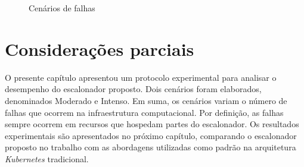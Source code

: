 \begin{figure}%
	\centering
	\qquad
	\caption{Cenários de falhas}%
	\label{fig:profiles-erro}%
\end{figure}

\section{Considerações parciais}

O presente capítulo apresentou um protocolo experimental para analisar o desempenho do escalonador proposto.
%
Dois cenários foram elaborados, denominados Moderado e Intenso.
%
Em suma, os cenários variam o número de falhas que ocorrem na infraestrutura computacional.
%
Por definição, as falhas sempre ocorrem em recursos que hospedam partes do escalonador.
%
Os resultados experimentais são apresentados no próximo capítulo, comparando o escalonador proposto no trabalho com as abordagens utilizadas como padrão na arquitetura \textit{Kubernetes} tradicional.























